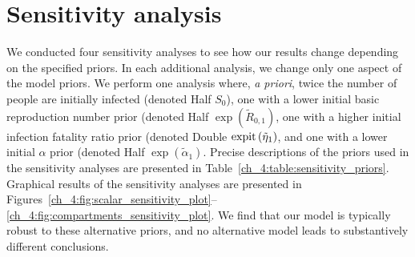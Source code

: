\section{Sensitivity analysis}
\label{ch_4:sec:sensitivity}
We conducted four sensitivity analyses to see how our results change depending on the specified priors.
In each additional analysis, we change only one aspect of the model priors.
We perform one analysis where, \textit{a priori}, twice the number of people are initially infected (denoted Half \( S_0 \)), one with a lower initial basic reproduction number prior (denoted Half \( \exp\left( \tilde{R} _{0,1} \right) \), one with a higher initial infection fatality ratio prior (denoted Double \( \operatorname{expit} \left( \tilde{\eta}_1 \right) \), and one with a lower initial $\alpha$ prior (denoted Half \( \exp \left( \tilde{\alpha}_1 \right) \).
Precise descriptions of the priors used in the sensitivity analyses are presented in Table~\ref{ch_4:table:sensitivity_priors}.
Graphical results of the sensitivity analyses are presented in Figures~\ref{ch_4:fig:scalar_sensitivity_plot}--\ref{ch_4:fig:compartments_sensitivity_plot}.
We find that our model is typically robust to these alternative priors, and no alternative model leads to substantively different conclusions.

